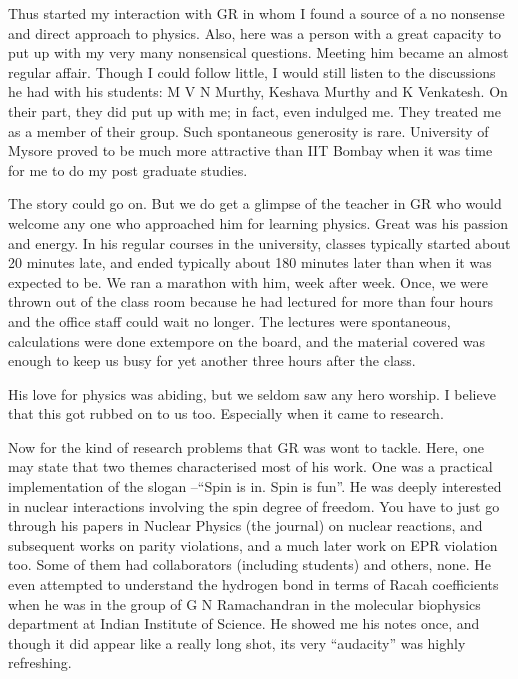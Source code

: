 Thus started my interaction with GR in whom I found a source of a no 
nonsense and direct approach to physics. Also, here was a person with a 
great capacity to put up with my very many nonsensical questions. 
Meeting him became an almost regular affair. Though I could follow 
little, I would still listen to the discussions he had with his 
students: M V N Murthy, Keshava Murthy and K Venkatesh. On their part, 
they did put up with me; in fact, even indulged me. They treated me as a 
member of their group. Such spontaneous generosity is rare. University 
of Mysore proved to be much more attractive than IIT Bombay when it was 
time for me to do my post graduate studies.

The story could go on. But we do get a glimpse of the teacher in GR who 
would welcome any one who approached him for learning physics. Great was 
his passion and energy. In his regular courses in the university, 
classes typically started about 20 minutes late, and ended typically 
about 180 minutes later than when it was expected to be. We ran a 
marathon with him, week after week. Once, we were thrown out of the 
class room because he had lectured for more than four hours and the 
office staff could wait no longer. The lectures were spontaneous, 
calculations were done extempore on the board, and the material covered 
was enough to keep us busy for yet another three hours after the class.

His love for physics was abiding, but we seldom saw any hero worship.  I 
believe that this got rubbed on to us too. Especially when it came to 
research.

Now for the kind of research problems that GR was wont to tackle. Here, 
one may state that two themes characterised most of his work. One was a 
practical implementation of the slogan --“Spin is in. Spin is fun”. He 
was deeply interested in nuclear interactions involving the spin degree 
of freedom. You have to just go through his papers in Nuclear Physics 
(the journal) on nuclear reactions, and subsequent works on parity 
violations, and a much later work on EPR violation too. Some of them had 
collaborators (including students) and others, none. He even attempted 
to understand the hydrogen bond in terms of Racah coefficients when he 
was in the group of G N Ramachandran in the molecular biophysics 
department at Indian Institute of Science. He showed me his notes once, 
and though it did appear like a really long shot, its very “audacity” 
was highly refreshing.

